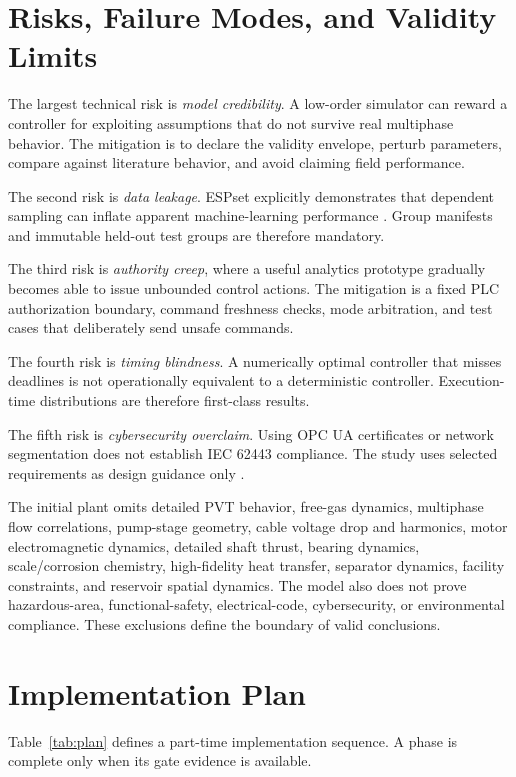 \documentclass[conference]{IEEEtran}
\begin{document}
\section{Risks, Failure Modes, and Validity Limits}
The largest technical risk is \emph{model credibility}. A low-order simulator can reward a controller for exploiting assumptions that do not survive real multiphase behavior. The mitigation is to declare the validity envelope, perturb parameters, compare against literature behavior, and avoid claiming field performance.

The second risk is \emph{data leakage}. ESPset explicitly demonstrates that dependent sampling can inflate apparent machine-learning performance \cite{varejao2024}. Group manifests and immutable held-out test groups are therefore mandatory.

The third risk is \emph{authority creep}, where a useful analytics prototype gradually becomes able to issue unbounded control actions. The mitigation is a fixed PLC authorization boundary, command freshness checks, mode arbitration, and test cases that deliberately send unsafe commands.

The fourth risk is \emph{timing blindness}. A numerically optimal controller that misses deadlines is not operationally equivalent to a deterministic controller. Execution-time distributions are therefore first-class results.

The fifth risk is \emph{cybersecurity overclaim}. Using OPC UA certificates or network segmentation does not establish IEC 62443 compliance. The study uses selected requirements as design guidance only \cite{iec62443}.

The initial plant omits detailed PVT behavior, free-gas dynamics, multiphase flow correlations, pump-stage geometry, cable voltage drop and harmonics, motor electromagnetic dynamics, detailed shaft thrust, bearing dynamics, scale/corrosion chemistry, high-fidelity heat transfer, separator dynamics, facility constraints, and reservoir spatial dynamics. The model also does not prove hazardous-area, functional-safety, electrical-code, cybersecurity, or environmental compliance. These exclusions define the boundary of valid conclusions.

\section{Implementation Plan}
Table~\ref{tab:plan} defines a part-time implementation sequence. A phase is complete only when its gate evidence is available.
\end{document}
